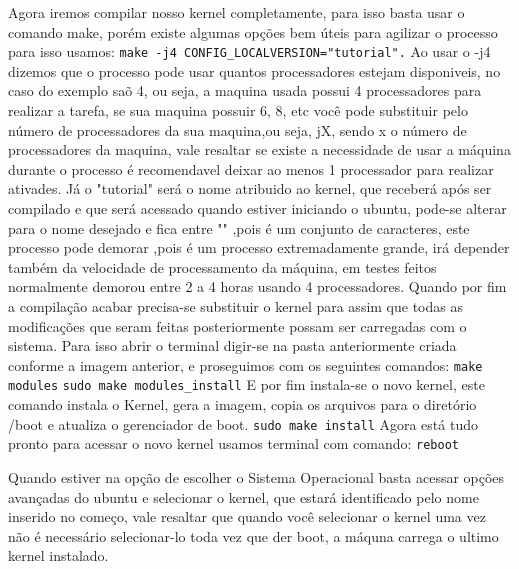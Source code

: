 \documentclass[12pt]{article}
\begin{document}
	Agora iremos compilar nosso kernel completamente, para isso basta usar o comando make, porém existe algumas opções bem úteis para agilizar o processo para isso usamos: \newline
	\verb!make -­j4 CONFIG_LOCALVERSION="tutorial".! \newline
	Ao usar o -j4 dizemos que o processo pode usar quantos processadores estejam disponiveis, no caso do exemplo saõ 4, ou seja, a maquina usada possui 4 processadores para realizar a tarefa, se sua maquina possuir 6, 8, etc você pode substituir pelo número de processadores da sua maquina,ou seja, jX, sendo x o número de processadores da maquina, vale resaltar se existe a necessidade de usar a máquina durante o processo é recomendavel deixar ao menos 1 processador para realizar  ativades. Já o "tutorial" será o nome atribuido ao kernel, que receberá após ser compilado e	que será acessado quando estiver iniciando o ubuntu, pode-se alterar para o nome desejado e fica entre "" ,pois é um conjunto de caracteres, este processo pode demorar ,pois é um processo extremadamente grande, irá depender também da velocidade de processamento da máquina, em testes feitos normalmente demorou entre 2 a 4 horas usando 4 processadores.
	\newline
	Quando por fim a compilação acabar precisa-se substituir o kernel para assim que todas as modificações que seram feitas posteriormente possam ser carregadas com o sistema. Para isso abrir o terminal digir-se na pasta anteriormente criada conforme a imagem anterior, e proseguimos com os seguintes comandos: \newline
	\verb"make modules" \newline
	\verb"sudo make modules_install"\newline
	E por fim instala-se o novo kernel, este comando instala o Kernel, gera a imagem, copia os arquivos para o diretório /boot e atualiza o gerenciador de boot.\newline
	\verb"sudo make install" \newline
	Agora está tudo pronto para acessar o novo kernel usamos terminal com comando:\newline
	\verb"reboot" \newline
	
	Quando estiver na opção de escolher o Sistema Operacional basta acessar opções avançadas do ubuntu e selecionar o kernel, que estará identificado pelo nome inserido no começo, vale resaltar que quando você selecionar o kernel uma vez não é necessário selecionar-lo toda vez que der boot, a máquna carrega o ultimo kernel instalado.
	
\end{document}
